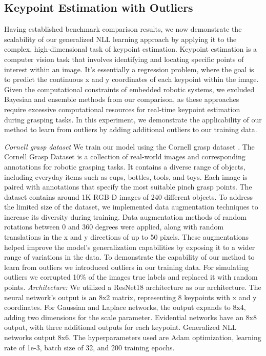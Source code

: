 \documentclass[letterpaper, 10 pt, conference]{ieeeconf}  %
\begin{document}
\subsection{Keypoint Estimation with Outliers}
Having established benchmark comparison results, we now demonstrate the scalability of our generalized NLL learning approach by applying it to the complex, high-dimensional task of keypoint estimation. 
Keypoint estimation is a computer vision task that involves identifying and locating specific points of interest within an image. 
It's essentially a regression problem, where the goal is to predict the continuous x and y coordinates of each keypoint within the image. 
Given the computational constraints of embedded robotic systems, we excluded Bayesian and ensemble methods from our comparison, as these approaches require excessive computational resources for real-time keypoint estimation during grasping tasks.
In this experiment, we demonstrate the applicability of our method to learn from outliers by adding additional outliers to our training data. 


\textit{Cornell grasp dataset}
We train our model using the Cornell grasp dataset \cite{lenz2015deep}. The Cornell Grasp Dataset is a collection of real-world images and corresponding annotations for robotic grasping tasks. It contains a diverse range of objects, including everyday items such as cups, bottles, tools, and toys. Each image is paired with annotations that specify the most suitable pinch grasp points. The dataset contains around 1K RGB-D images of 240 different objects. %
To address the limited size of the dataset, we implemented data augmentation techniques to increase its diversity during training.
Data augmentation methods of random rotations between 0 and 360 degrees were applied, along with random translations in the x and y directions of up to 50 pixels. 
These augmentations helped improve the model's generalization capabilities by exposing it to a wider range of variations in the data.
To demonstrate the capability of our method to learn from outliers we introduced outliers in our training data. For simulating outliers we corrupted 10\% of the images true labels and replaced it with random points. 
\textit{Architecture:} 
We utilized a ResNet18 architecture \cite{he2016deep} as our architecture. The neural network's output is an 8x2 matrix, representing 8 keypoints with x and y coordinates. For Gaussian and Laplace networks, the output expands to 8x4, adding two dimensions for the scale parameter. Evidential networks have an 8x8 output, with three additional outputs for each keypoint. Generalized NLL networks output 8x6.  The hyperparameters used are Adam optimization, learning rate of 1e-3, batch size of 32, and 200 training epochs. 
\end{document}
